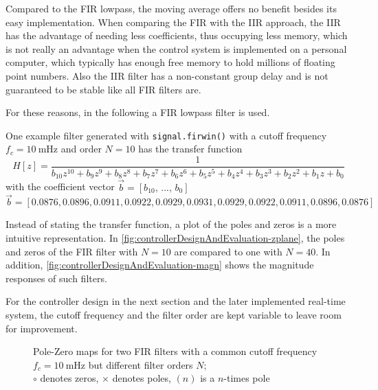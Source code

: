 Compared to the FIR lowpass, the moving average offers no benefit besides its easy implementation.
When comparing the FIR with the IIR approach, the IIR has the advantage of needing less coefficients, thus occupying less memory, which is not really an advantage when the control system is implemented on a personal computer, which typically has enough free memory to hold millions of floating point numbers.
Also the IIR filter has a non-constant group delay and is not guaranteed to be stable like all FIR filters are.

For these reasons, in the following a FIR lowpass filter is used.

One example filter generated with \texttt{signal.firwin()} with a cutoff frequency $f_c=\SI{10}{\milli\hertz}$ and order $N=10$ has the transfer function
\begin{equation}
H[z]=\frac{1}{b_{10} z^{10} + b_{9} z^9 + b_{8} z^8 + b_{7} z^7 + b_{6} z^6 + b_{5} z^5 + b_{4} z^4 + b_{3} z^3  + b_{2} z^2 + b_{1} z + b_{0}}
\end{equation}
with the coefficient vector $\vec{b}=[b_{10},\,...,\,b_0]$
\begin{equation}
\vec{b}=[0.0876,0.0896,0.0911,0.0922,0.0929,0.0931,0.0929,0.0922,0.0911,0.0896,0.0876]
\end{equation}

Instead of stating the transfer function, a plot of the poles and zeros is a more intuitive representation. In \autoref{fig:controllerDesignAndEvaluation-zplane}, the poles and zeros of the FIR filter with $N=10$ are compared to one with $N=40$. In addition, \autoref{fig:controllerDesignAndEvaluation-magn} shows the magnitude responses of such filters.

For the controller design in the next section and the later implemented real-time system, the cutoff frequency and the filter order are kept variable to leave room for improvement.

\begin{figure}[tb]
    \centering
        \subfloat[$N=10$]{}
        \qquad
        \subfloat[$N=40$]{}
       \caption{Pole-Zero maps for two FIR filters with a common cutoff frequency $f_c=\SI{10}{\milli\hertz}$ but different filter orders $N$;\\ $\circ$ denotes zeros, $\times$ denotes poles, $(n)$ is a $n$-times pole}
    \label{fig:controllerDesignAndEvaluation-zplane}
\end{figure}

